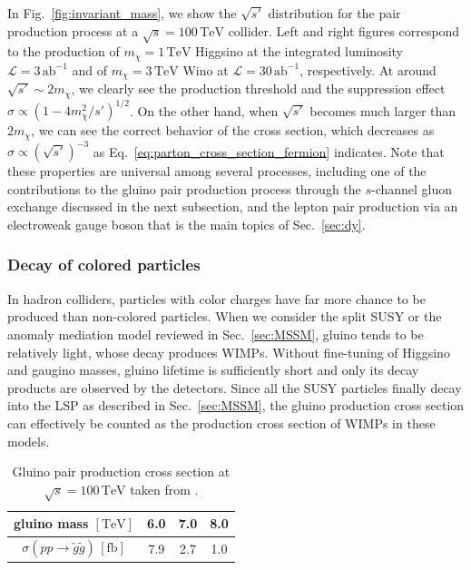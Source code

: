 \documentclass[12pt,twoside,book]{article}
\begin{document}
In Fig.~\ref{fig:invariant_mass}, we show the $\sqrt{s'}$ distribution for the pair production process at a $\sqrt{s} = 100\,\mathrm{TeV}$ collider.
Left and right figures correspond to the production of $m_\chi = 1\,\mathrm{TeV}$ Higgsino at the integrated luminosity $\mathcal{L} = 3\,\mathrm{ab}^{-1}$ and of $m_\chi = 3\,\mathrm{TeV}$ Wino at $\mathcal{L} = 30\,\mathrm{ab}^{-1}$, respectively.
At around $\sqrt{s'} \sim 2 m_\chi$, we clearly see the production threshold and the suppression effect $\sigma \propto (1-4 m_\chi^2 / s')^{1/2}$.
On the other hand, when $\sqrt{s'}$ becomes much larger than $2m_\chi$, we can see the correct behavior of the cross section, which decreases as $\sigma \propto (\sqrt{s'})^{-3}$ as Eq.~\eqref{eq:parton_cross_section_fermion} indicates.
Note that these properties are universal among several processes, including one of the contributions to the gluino pair production process through the $s$-channel gluon exchange discussed in the next subsection, and the lepton pair production via an electroweak gauge boson that is the main topics of Sec.~\ref{sec:dy}.




\subsubsection*{Decay of colored particles}

In hadron colliders, particles with color charges have far more chance to be produced than non-colored particles.
When we consider the split SUSY or the anomaly mediation model reviewed in Sec.~\ref{sec:MSSM}, gluino tends to be relatively light, whose decay produces WIMPs.
Without fine-tuning of Higgsino and gaugino masses, gluino lifetime is sufficiently short and only its decay products are observed by the detectors.
Since all the SUSY particles finally decay into the LSP as described in Sec.~\ref{sec:MSSM}, the gluino production cross section can effectively be counted as the production cross section of WIMPs in these models.

\begin{table}[t]
  \centering
  \begin{tabular}{c|ccc}
    gluino mass $\mathrm{[TeV]}$ & 6.0 & 7.0 & 8.0 \\ \hline
    $\sigma(p p \to \tilde{g} \tilde{g})\, \mathrm{[fb]}$ & 7.9 & 2.7 & 1.0
  \end{tabular}
  \caption{Gluino pair production cross section at $\sqrt{s} = 100\,\mathrm{TeV}$ taken from \cite{Asai:2019wst}.}
  \label{tab:gluino_pair}
\end{table}
\end{document}
